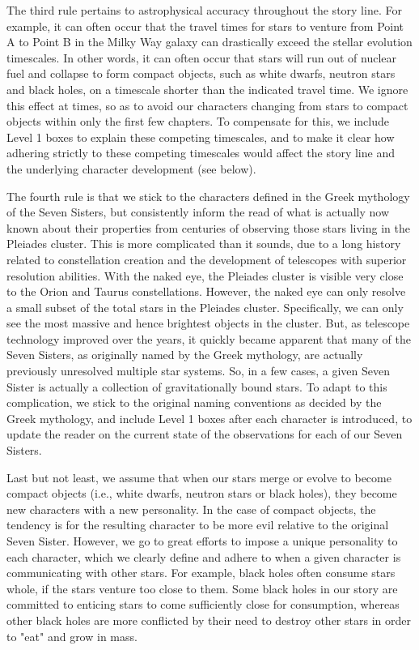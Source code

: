 \documentclass[main.tex]{subfiles}
\begin{document}
\par \nar The third rule pertains to astrophysical accuracy throughout the story line.  For example, it can often occur that the travel times for stars to venture from Point A to Point B in the Milky Way galaxy can drastically exceed the stellar evolution timescales.  In other words, it can often occur that stars will run out of nuclear fuel and collapse to form compact objects, such as white dwarfs, neutron stars and black holes, on a timescale shorter than the indicated travel time.  We ignore this effect at times, so as to avoid our characters changing from stars to compact objects within only the first few chapters.  To compensate for this, we include Level 1 boxes to explain these competing timescales, and to make it clear how adhering strictly to these competing timescales would affect the story line and the underlying character development (see below).

\par \nar The fourth rule is that we stick to the characters defined in the Greek mythology of the Seven Sisters, but consistently inform the read of what is actually now known about their properties from centuries of observing those stars living in the Pleiades cluster.  This is more complicated than it sounds, due to a long history related to constellation creation and the development of telescopes with superior resolution abilities.  With the naked eye, the Pleiades cluster is visible very close to the Orion and Taurus constellations.  However, the naked eye can only resolve a small subset of the total stars in the Pleiades cluster.  Specifically, we can only see the most massive and hence brightest objects in the cluster.  But, as telescope technology improved over the years, it quickly became apparent that many of the Seven Sisters, as originally named by the Greek mythology, are actually previously unresolved multiple star systems.  So, in a few cases, a given Seven Sister is actually a collection of gravitationally bound stars.  To adapt to this complication, we stick to the original naming conventions as decided by the Greek mythology, and include Level 1 boxes after each character is introduced, to update the reader on the current state of the observations for each of our Seven Sisters.

\par \nar Last but not least, we assume that when our stars merge or evolve to become compact objects (i.e., white dwarfs, neutron stars or black holes), they become new characters with a new personality.  In the case of compact objects, the tendency is for the resulting character to be more evil relative to the original Seven Sister.  However, we go to great efforts to impose a unique personality to each character, which we clearly define and adhere to when a given character is communicating with other stars.  For example, black holes often consume stars whole, if the stars venture too close to them.  Some black holes in our story are committed to enticing stars to come sufficiently close for consumption, whereas other black holes are more conflicted by their need to destroy other stars in order to "eat" and grow in mass.
\end{document}
